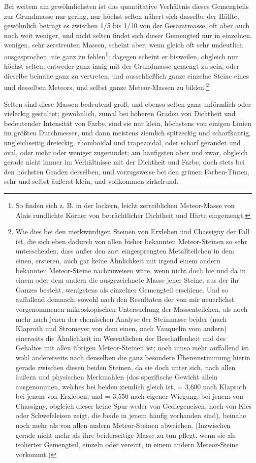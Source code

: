 \documentclass[a4paper, 11pt, oneside, german]{article}
\begin{document}
Bei weitem am gewöhnlichsten ist das quantitative Verhältnis dieses Gemengteils zur Grundmasse nur gering, nur höchst selten nähert sich dasselbe der Hälfte, gewöhnlich beträgt es zwischen 1/5 bis 1/10 von der Gesamtmasse, oft aber auch noch weit weniger, und nicht selten findet sich dieser Gemengteil nur in einzelnen, wenigen, sehr zerstreuten Massen, scheint aber, wenn gleich oft sehr undeutlich ausgesprochen, nie ganz zu fehlen\footnote{So finden sich z. B. in der lockern, leicht zerreiblichen Meteor-Masse von Alais rundlichte Körner von beträchtlicher Dichtheit und Härte eingemengt.}; dagegen scheint er bisweilen, obgleich nur höchst selten, entweder ganz innig mit der Grundmasse gemengt zu sein, oder dieselbe beinahe ganz zu vertreten, und ausschließlich ganze einzelne Steine eines und desselben Meteors, und selbst ganze Meteor-Massen zu bilden.\footnote{Wie dies bei den merkwürdigen Steinen von Erxleben und Chassigny der Fall ist, die sich eben dadurch von allen bisher bekannten Meteor-Steinen so sehr unterscheiden, dass außer den zart eingesprengten Metallteilchen in dem einen, ersteren, auch gar keine Ähnlichkeit mit irgend einem andern bekannten Meteor-Steine nachzuweisen wäre, wenn nicht doch hie und da in einem oder dem andern die ausgezeichnete Masse jener Steine, aus der ihr Ganzes besteht, wenigstens als einzelner Gemengteil erschiene. Und so auffallend demnach, sowohl nach den Resultaten der von mir neuerlichst vorgenommenen mikroskopischen Untersuchung der Massenteilchen, als noch mehr nach jenen der chemischen Analyse der Steinmasse beider (nach Klaproth und Stromeyer von dem einen, nach Vauquelin vom andern) einerseits die Ähnlichkeit im Wesentlichen der Beschaffenheit und des Gehaltes mit allen übrigen Meteor-Steinen ist; noch umso mehr auffallend ist wohl andererseits nach denselben die ganz besondere Übereinstimmung hierin gerade zwischen diesen beiden Steinen, da sie doch unter sich, nach allen äußern und physischen Merkmahlen (das spezifische Gewicht allein ausgenommen, welches bei beiden ziemlich gleich ist, = 3,600 nach Klaproth bei jenem von Erxleben, und = 3,550 nach eigener Wiegung, bei jenem von Chassigny, obgleich dieser keine Spur weder von Gediegeneisen, noch von Kies oder Schwefeleisen zeigt, die beide in jenem häufig vorhanden sind), beinahe noch mehr als von allen andern Meteor-Steinen abweichen. (Inzwischen gerade nicht mehr als ihre beiderseitige Masse zu tun pflegt, wenn sie als isolierter Gemengteil, einzeln oder vereint, in einem andern Meteor-Steine vorkommt.)}

Selten sind diese Massen bedeutend groß, und ebenso selten ganz unförmlich oder vieleckig gestaltet; gewöhnlich, zumal bei höheren Graden von Dichtheit und bedeutender Intensität von Farbe, sind sie nur klein, höchstens von einigen Linien im größten Durchmesser, und dann meistens ziemlich spitzeckig und scharfkantig, ungleichseitig dreieckig, rhomboidal und trapezoidal, oder scharf gerandet und oval, oder mehr oder weniger zugerundet; am häufigsten aber und zwar, obgleich gerade nicht immer im Verhältnisse mit der Dichtheit und Farbe, doch stets bei den höchsten Graden derselben, und vorzugsweise bei den grünen Farben-Tinten, sehr und selbst äußerst klein, und vollkommen zirkelrund.
\end{document}
